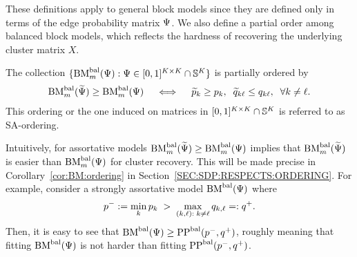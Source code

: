 %
These definitions apply to general block models since they are defined only in terms of the edge probability matrix $\Psi$. 
%
We also define a partial order among balanced block models, which reflects the hardness of recovering the underlying cluster matrix $X$. %
\begin{defn}\label{def:BM:ordering}
  The collection $\{\textrm{BM}^{\textrm{bal}}_m(\Psi): \Psi \in [0,1]^{K\times K} \cap \mathbb{S}^{K} \}$ is partially ordered by
  \begin{align}\label{eq:BM:ordering:def}
    \textrm{BM}^{\textrm{bal}}_m(\widetilde{\Psi}) \ge \textrm{BM}^{\textrm{bal}}_m(\Psi) \quad \iff \quad \widetilde{p}_k \ge p_k, \;\; \widetilde{q}_{k \ell} \le q_{k \ell}, \;\;\forall k \neq \ell.
  \end{align}
  This ordering or the one induced on matrices in $[0,1]^{K \times K} \cap \mathbb{S}^{K}$  is referred to as SA-ordering.
\end{defn}
%
Intuitively, for assortative models $\textrm{BM}^{\textrm{bal}}_m(\widetilde{\Psi}) \ge \textrm{BM}^{\textrm{bal}}_m(\Psi) $ implies that $\textrm{BM}^{\textrm{bal}}_m(\widetilde{\Psi})$ is easier than $\textrm{BM}^{\textrm{bal}}_m(\Psi)$ for cluster recovery.   This will be made precise  in Corollary~\ref{cor:BM:ordering} in Section~\ref{SEC:SDP:RESPECTS:ORDERING}.   For example, consider a strongly assortative model $\textrm{BM}^{\textrm{bal}}(\Psi)$ where 
\begin{align}\label{eq:pminus:qplus}
  p^- := \min_{k} p_k \; > \; \max_{(k,\ell): \; k \neq \ell} q_{k,\ell} =: q^+.
\end{align}
Then, it is easy to see that $ \textrm{BM}^{\textrm{bal}}(\Psi) \ge \text{PP}^{\text{bal}}(p^{-},q^{+})$,  roughly meaning that fitting $\textrm{BM}^{\textrm{bal}}(\Psi)$ is not harder than fitting $\text{PP}^{\text{bal}}(p^{-},q^{+})$.

